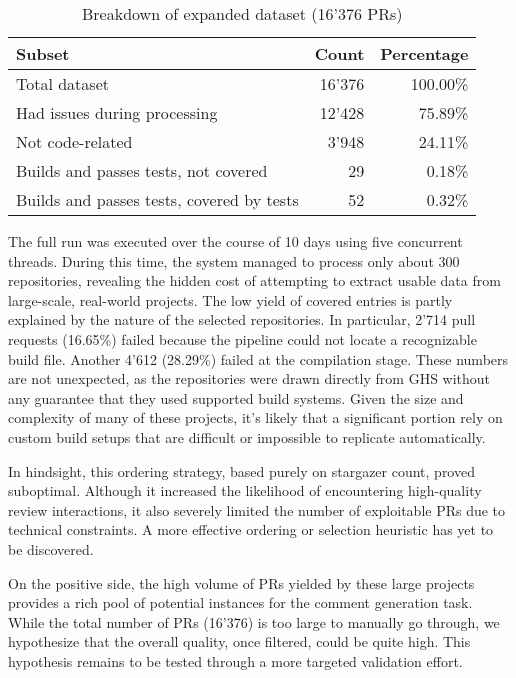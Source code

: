\begin{table}[ht]
	\centering
	\begin{tabular}{lrr}
		\toprule
		\textbf{Subset}                           & \textbf{Count} & \textbf{Percentage} \\
		\midrule
		Total dataset                             & 16'376         & 100.00\%            \\
		Had issues during processing              & 12'428         & 75.89\%             \\
		Not code-related                          & 3'948          & 24.11\%             \\
		Builds and passes tests, not covered      & 29             & 0.18\%              \\
		Builds and passes tests, covered by tests & 52             & 0.32\%              \\
		\bottomrule
	\end{tabular}
	\caption{Breakdown of expanded dataset (16'376 PRs)}
	\label{tab:expanded-distribution}
\end{table}

The full run was executed over the course of 10 days using five concurrent threads. During this
time, the system managed to process only about 300 repositories, revealing the hidden cost of
attempting to extract usable data from large-scale, real-world projects. The low yield of covered
entries is partly explained by the nature of the selected repositories. In particular, 2'714 pull
requests (16.65\%) failed because the pipeline could not locate a recognizable build file. Another
4'612 (28.29\%) failed at the compilation stage. These numbers are not unexpected, as the
repositories were drawn directly from GHS without any guarantee that they used supported build
systems. Given the size and complexity of many of these projects, it's likely that a significant
portion rely on custom build setups that are difficult or impossible to replicate automatically.

In hindsight, this ordering strategy, based purely on stargazer count, proved suboptimal. Although
it increased the likelihood of encountering high-quality review interactions, it also severely
limited the number of exploitable PRs due to technical constraints. A more effective ordering or
selection heuristic has yet to be discovered.

On the positive side, the high volume of PRs yielded by these large projects provides a rich pool of
potential instances for the comment generation task. While the total number of PRs (16'376) is too
large to manually go through, we hypothesize that the overall quality, once filtered, could be quite
high. This hypothesis remains to be tested through a more targeted validation effort.


